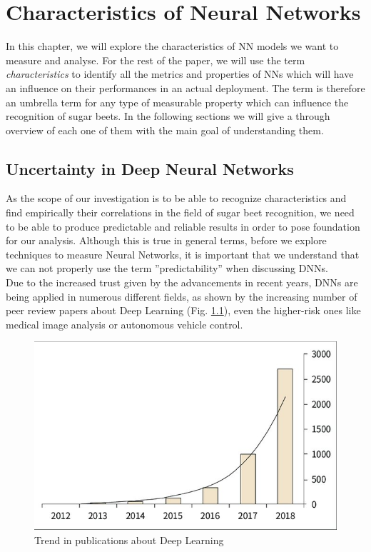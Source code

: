 \chapter{Characteristics of Neural Networks}\label{char_nn}
In this chapter, we will explore the characteristics of NN models we want to measure and analyse. For the rest of the paper, we will use the term \textit{characteristics} to identify all the metrics and properties of NNs which will have an influence on their performances in an actual deployment. The term is therefore an umbrella term for any type of measurable property which can influence the recognition of sugar beets. In the following sections we will give a through overview of each one of them with the main goal of understanding them. 

\section{Uncertainty in Deep Neural Networks}
As the scope of our investigation is to be able to recognize characteristics and find empirically their correlations in the field of sugar beet recognition, we need to be able to produce predictable and reliable results in order to pose foundation for our analysis. Although this is true in general terms, before we explore techniques to measure Neural Networks, it is important that we understand that we can not properly use the term ''predictability'' when discussing DNNs. \\
Due to the increased trust given by the advancements in recent years, DNNs are being applied in numerous different fields, as shown by the increasing number of peer review papers about Deep Learning (Fig. \ref{fig:annual_trend}), even the higher-risk ones 
like medical image analysis or autonomous vehicle control. \cite{gawlikowski2021survey}
\begin{figure}[h]
    \centering
    \includegraphics{img/Annual-trend-in-the-number-of-papers-related-to-deep-learning-in-the-medical-field_W640.jpg}
    \caption[Trend in publications about Deep Learning]{Trend in publications about Deep Learning  \cite{Number_of_DL_papers}}
    \label{fig:annual_trend}
\end{figure}


